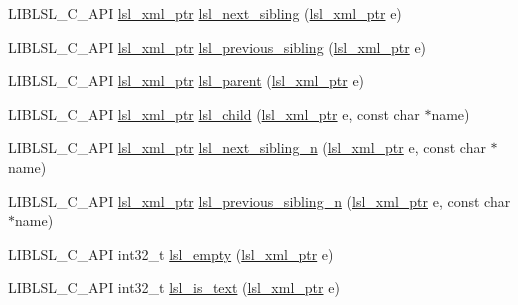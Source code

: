 \begin{DoxyCompactItemize}
L\+I\+B\+L\+S\+L\+\_\+\+C\+\_\+\+A\+PI \hyperlink{namespacelsl_a5edc7a49a1a1be1634fe6dce3d59c59b}{lsl\+\_\+xml\+\_\+ptr} \hyperlink{namespacelsl_ad719cddda958c613ff328245dc5b4277}{lsl\+\_\+next\+\_\+sibling} (\hyperlink{namespacelsl_a5edc7a49a1a1be1634fe6dce3d59c59b}{lsl\+\_\+xml\+\_\+ptr} e)
\item 
L\+I\+B\+L\+S\+L\+\_\+\+C\+\_\+\+A\+PI \hyperlink{namespacelsl_a5edc7a49a1a1be1634fe6dce3d59c59b}{lsl\+\_\+xml\+\_\+ptr} \hyperlink{namespacelsl_a61acf3af105e47f718bbc312766caf44}{lsl\+\_\+previous\+\_\+sibling} (\hyperlink{namespacelsl_a5edc7a49a1a1be1634fe6dce3d59c59b}{lsl\+\_\+xml\+\_\+ptr} e)
\item 
L\+I\+B\+L\+S\+L\+\_\+\+C\+\_\+\+A\+PI \hyperlink{namespacelsl_a5edc7a49a1a1be1634fe6dce3d59c59b}{lsl\+\_\+xml\+\_\+ptr} \hyperlink{namespacelsl_aa8decbe6cf9d9f1c6358af2d6a475bd5}{lsl\+\_\+parent} (\hyperlink{namespacelsl_a5edc7a49a1a1be1634fe6dce3d59c59b}{lsl\+\_\+xml\+\_\+ptr} e)
\item 
L\+I\+B\+L\+S\+L\+\_\+\+C\+\_\+\+A\+PI \hyperlink{namespacelsl_a5edc7a49a1a1be1634fe6dce3d59c59b}{lsl\+\_\+xml\+\_\+ptr} \hyperlink{namespacelsl_a023258f274202055146894d26e3cf2ad}{lsl\+\_\+child} (\hyperlink{namespacelsl_a5edc7a49a1a1be1634fe6dce3d59c59b}{lsl\+\_\+xml\+\_\+ptr} e, const char $\ast$name)
\item 
L\+I\+B\+L\+S\+L\+\_\+\+C\+\_\+\+A\+PI \hyperlink{namespacelsl_a5edc7a49a1a1be1634fe6dce3d59c59b}{lsl\+\_\+xml\+\_\+ptr} \hyperlink{namespacelsl_ac898e643d9e43785030c3e1a7524ea70}{lsl\+\_\+next\+\_\+sibling\+\_\+n} (\hyperlink{namespacelsl_a5edc7a49a1a1be1634fe6dce3d59c59b}{lsl\+\_\+xml\+\_\+ptr} e, const char $\ast$name)
\item 
L\+I\+B\+L\+S\+L\+\_\+\+C\+\_\+\+A\+PI \hyperlink{namespacelsl_a5edc7a49a1a1be1634fe6dce3d59c59b}{lsl\+\_\+xml\+\_\+ptr} \hyperlink{namespacelsl_a1b42f95654ea48c92a15bd077e6c73ac}{lsl\+\_\+previous\+\_\+sibling\+\_\+n} (\hyperlink{namespacelsl_a5edc7a49a1a1be1634fe6dce3d59c59b}{lsl\+\_\+xml\+\_\+ptr} e, const char $\ast$name)
\item 
L\+I\+B\+L\+S\+L\+\_\+\+C\+\_\+\+A\+PI int32\+\_\+t \hyperlink{namespacelsl_aa8e3affdd320f70d77b87262d508ba58}{lsl\+\_\+empty} (\hyperlink{namespacelsl_a5edc7a49a1a1be1634fe6dce3d59c59b}{lsl\+\_\+xml\+\_\+ptr} e)
\item 
L\+I\+B\+L\+S\+L\+\_\+\+C\+\_\+\+A\+PI int32\+\_\+t \hyperlink{namespacelsl_a423fa21a73fa370762fe168081f12a41}{lsl\+\_\+is\+\_\+text} (\hyperlink{namespacelsl_a5edc7a49a1a1be1634fe6dce3d59c59b}{lsl\+\_\+xml\+\_\+ptr} e)
\item 

\end{DoxyCompactItemize}

